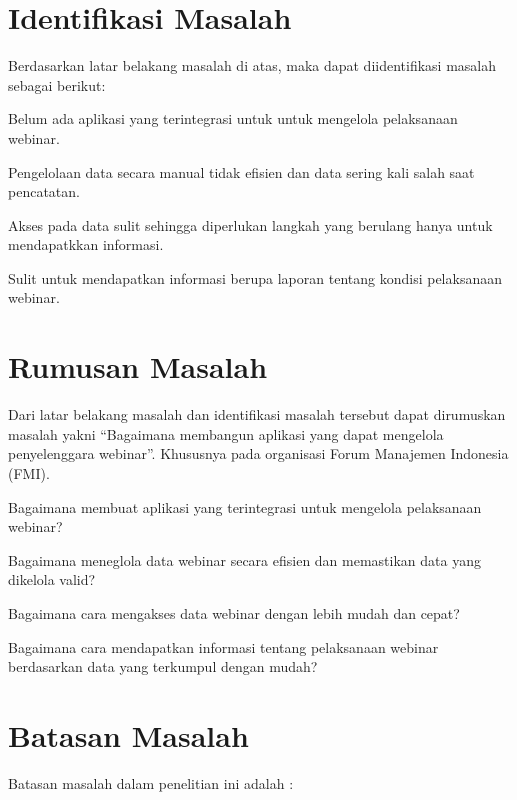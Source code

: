 \section{Identifikasi Masalah}

Berdasarkan latar belakang masalah di atas, maka dapat diidentifikasi masalah sebagai berikut:

\begin{ol}
  \item Belum ada aplikasi yang terintegrasi untuk untuk mengelola pelaksanaan webinar.
  \item Pengelolaan data secara manual tidak efisien dan data sering kali salah saat pencatatan.
  \item Akses pada data sulit sehingga diperlukan langkah yang berulang hanya untuk mendapatkkan informasi.
  \item Sulit untuk mendapatkan informasi berupa laporan tentang kondisi pelaksanaan webinar.
\end{ol}


\section{Rumusan Masalah}

Dari latar belakang masalah dan identifikasi masalah tersebut dapat dirumuskan masalah yakni “Bagaimana membangun aplikasi yang dapat mengelola penyelenggara webinar”. Khususnya pada organisasi Forum Manajemen Indonesia (FMI).

\begin{ol}
\item Bagaimana membuat aplikasi yang terintegrasi untuk mengelola pelaksanaan webinar?
\item Bagaimana meneglola data webinar secara efisien dan memastikan data yang dikelola valid?
\item Bagaimana cara mengakses data webinar dengan lebih mudah dan cepat?
\item Bagaimana cara mendapatkan informasi tentang pelaksanaan webinar berdasarkan data yang terkumpul dengan mudah?
\end{ol}

\section{Batasan Masalah}

Batasan masalah dalam penelitian ini adalah :

